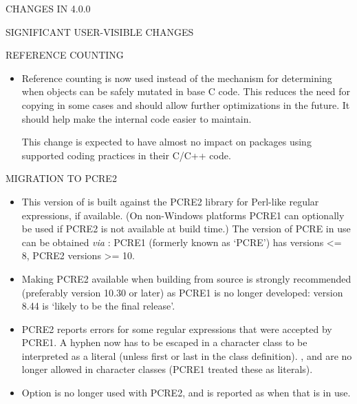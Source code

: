 \documentclass[letterpaper]{book}
\begin{document}
\begin{Section}{ CHANGES IN 4.0.0}
\begin{SubSection}{SIGNIFICANT USER-VISIBLE CHANGES}
\end{SubSection}


%
\begin{SubSection}{REFERENCE COUNTING}
\begin{itemize}

\item{} Reference counting is now used instead of the 
mechanism for determining when objects can be safely mutated in
base C code.  This reduces the need for copying in some cases and
should allow further optimizations in the future.  It should
help make the internal code easier to maintain.

This change is expected to have almost no impact on packages
using supported coding practices in their C/C++ code.

\end{itemize}


\end{SubSection}


%
\begin{SubSection}{MIGRATION TO PCRE2}
\begin{itemize}

\item{} This version of \R{} is built against the PCRE2 library for
Perl-like regular expressions, if available.  (On non-Windows
platforms PCRE1 can optionally be used if PCRE2 is not available
at build time.)  The version of PCRE in use can be obtained
\emph{via} : PCRE1 (formerly known as
`PCRE') has versions <= 8, PCRE2 versions >= 10.

\item{} Making PCRE2 available when building \R{} from source is
strongly recommended (preferably version 10.30 or later) as PCRE1
is no longer developed: version 8.44 is
`likely to be the final release'.


\item{} PCRE2 reports errors for some regular expressions that were
accepted by PCRE1.  A hyphen now has to be escaped in a character
class to be interpreted as a literal (unless first or last in the
class definition).  ,  and  are no
longer allowed in character classes (PCRE1 treated these as
literals).

\item{} Option  is no longer used with PCRE2, and is
reported as  when that is in use.

\end{itemize}



\end{SubSection}
\end{Section}
\end{document}
